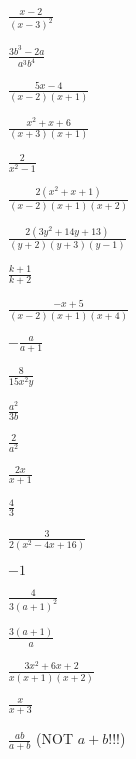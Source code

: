 \documentclass[11pt,a4paper,twoside]{article}
\begin{document}
\begin{answers}
\begin{inparaenum}[\bfseries 1.]
\begin{inparaenum}
          \item	$\frac{x - 2}{(x - 3)^2}$
          \item	$\frac{3b^3 - 2a}{a^3 b^4}$
          \item	$\frac{5x - 4}{(x - 2)(x + 1)}$
          \item	$\frac{x^2 + x + 6}{(x + 3)(x + 1)}$
          \item	$\frac{2}{x^2 - 1}$
          \item	$\frac{2\left(x^2 + x + 1\right)}{(x - 2)(x + 1)(x + 2)}$
          \item	$\frac{2\left(3y^2 + 14y + 13\right)}{(y + 2)(y + 3)(y - 1)}$
          \item	$\frac{k + 1}{k + 2}$
          \item	$\frac{-x + 5}{(x - 2)(x + 1)(x + 4)}$
          \item	$-\frac{a}{a + 1}$
          \end{inparaenum}
  \item   \begin{inparaenum}
          \item	$\frac{8}{15x^2 y}$
          \item	$\frac{a^2}{3b}$
          \item	$\frac{2}{a^2}$
          \item	$\frac{2x}{x + 1}$
          \item	$\frac{4}{3}$
          \item	$\frac{3}{2\left(x^2 - 4x + 16\right)}$
          \item	$-1$
          \item	$\frac{4}{3(a + 1)^2}$
          \item	$\frac{3(a  +1)}{a}$
          \end{inparaenum}
  \item   \begin{inparaenum}
          \item   $\frac{3x^2 + 6x + 2}{x(x + 1)(x + 2)}$
          \item   $\frac{x}{x + 3}$
          \end{inparaenum}
  \item   $\frac{ab}{a + b}$ (NOT $a + b$!!!)

\end{inparaenum}
\end{answers}
\end{document}
